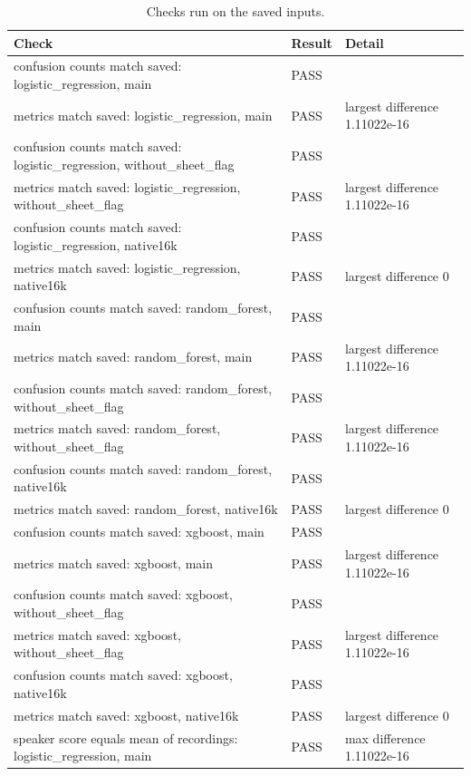 \documentclass[11pt,a4paper]{article}
\begin{document}
\begin{table}[H]\centering\footnotesize\renewcommand{\arraystretch}{1.15}
\caption{Checks run on the saved inputs.}
\begin{tabular}{p{9.5cm}ll}
\toprule
\textbf{Check} & \textbf{Result} & \textbf{Detail}\\
\midrule
confusion counts match saved: logistic\_regression, main & PASS & \\
metrics match saved: logistic\_regression, main & PASS & largest difference 1.11022e-16\\
confusion counts match saved: logistic\_regression, without\_sheet\_flag & PASS & \\
metrics match saved: logistic\_regression, without\_sheet\_flag & PASS & largest difference 1.11022e-16\\
confusion counts match saved: logistic\_regression, native16k & PASS & \\
metrics match saved: logistic\_regression, native16k & PASS & largest difference 0\\
confusion counts match saved: random\_forest, main & PASS & \\
metrics match saved: random\_forest, main & PASS & largest difference 1.11022e-16\\
confusion counts match saved: random\_forest, without\_sheet\_flag & PASS & \\
metrics match saved: random\_forest, without\_sheet\_flag & PASS & largest difference 1.11022e-16\\
confusion counts match saved: random\_forest, native16k & PASS & \\
metrics match saved: random\_forest, native16k & PASS & largest difference 0\\
confusion counts match saved: xgboost, main & PASS & \\
metrics match saved: xgboost, main & PASS & largest difference 1.11022e-16\\
confusion counts match saved: xgboost, without\_sheet\_flag & PASS & \\
metrics match saved: xgboost, without\_sheet\_flag & PASS & largest difference 1.11022e-16\\
confusion counts match saved: xgboost, native16k & PASS & \\
metrics match saved: xgboost, native16k & PASS & largest difference 0\\
speaker score equals mean of recordings: logistic\_regression, main & PASS & max difference 1.11022e-16\\

\end{tabular}
\end{table}
\end{document}
